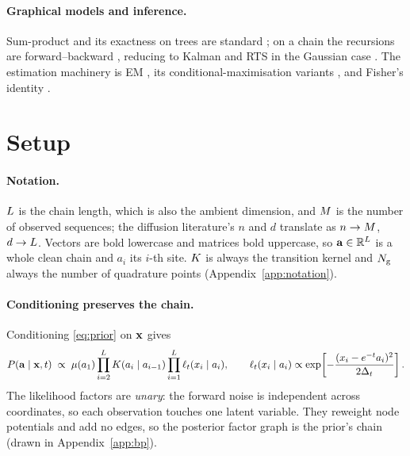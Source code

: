 \documentclass{article}
\begin{document}
\paragraph{Graphical models and inference.} Sum-product and its exactness on trees are standard
\citep{pearl1988,kschischang2001,mezard2009,wainwright2008}; on a chain the recursions are
forward--backward \citep{baum1970,rabiner1989}, reducing to Kalman and RTS in the Gaussian case
\citep{kalman1960,rauch1965}. The estimation machinery is EM \citep{dempster1977}, its
conditional-maximisation variants \citep{wu1983,meng1993}, and Fisher's identity
\citep{fisher1925,louis1982,cappe2005}.

\section{Setup}
\label{sec:setting}

\paragraph{Notation.} $L$ is the chain length, which is also the ambient dimension, and
$M$ is the number of observed sequences; the diffusion literature's $n$ and $d$ translate as
$n\to M$, $d\to L$. Vectors are bold lowercase and matrices bold uppercase, so
$\mathbf{a}\in\mathbb{R}^{L}$ is a whole clean chain and $a_i$ its $i$-th site. $K$ is always the
transition kernel and $N_{\mathrm{g}}$ always the number of quadrature points
(Appendix~\ref{app:notation}).



\paragraph{Conditioning preserves the chain.} Conditioning \eqref{eq:prior} on $\mathbf{x}$ gives
\begin{equation}
\label{eq:posterior}
P(\mathbf{a} \mid \mathbf{x},t) \;\propto\;
\mu(a_1)\prod_{i=2}^{L} K(a_i\mid a_{i-1})
\prod_{i=1}^{L} \ell_t(x_i \mid a_i),
\qquad
\ell_t(x_i\mid a_i) \propto \exp\!\left[-\frac{(x_i - e^{-t}a_i)^2}{2\Delta_t}\right].
\end{equation}
The likelihood factors are \emph{unary}: the forward noise is independent across coordinates, so
each observation touches one latent variable. They reweight node potentials and add no edges, so
the posterior factor graph is the prior's chain (drawn in Appendix~\ref{app:bp}).
\end{document}
